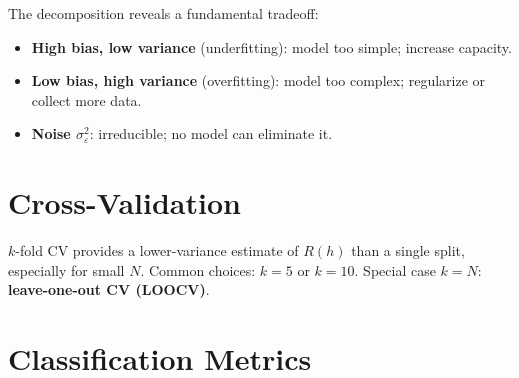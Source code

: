 \documentclass[oneside]{book}
\begin{document}

The decomposition reveals a fundamental tradeoff:
\begin{itemize}
    \item \textbf{High bias, low variance} (underfitting): model too simple; increase capacity.
    \item \textbf{Low bias, high variance} (overfitting): model too complex; regularize or collect more data.
    \item \textbf{Noise $\sigma^2_\varepsilon$}: irreducible; no model can eliminate it.
\end{itemize}

\section{Cross-Validation}


$k$-fold CV provides a lower-variance estimate of $R(h)$ than a single split, especially for small $N$. Common choices: $k = 5$ or $k = 10$. Special case $k = N$: \textbf{leave-one-out CV (LOOCV)}.

\section{Classification Metrics}
\end{document}
